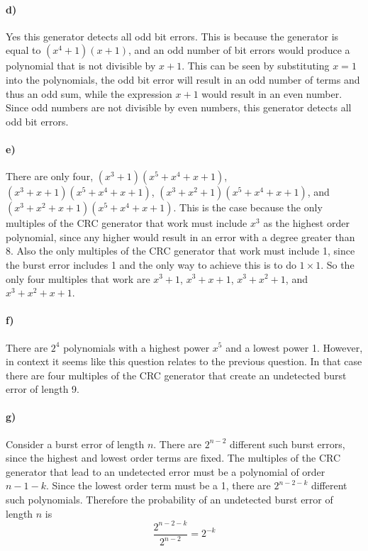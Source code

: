 \documentclass[12pt]{article}
\begin{document}
\paragraph{d)}

Yes this generator detects all odd bit errors. This is because the generator is equal to \((x^4+1)(x+1)\), and an odd number of bit errors would produce a polynomial that is not divisible by \(x+1\). This can be
seen by substituting \(x=1\) into the polynomials, the odd bit error will result in an odd number of terms and thus an odd sum, while the expression \(x+1\) would result in an even number. Since odd numbers are
not divisible by even numbers, this generator detects all odd bit errors.

\paragraph{e)}

There are only four, \((x^3+1)(x^5+x^4+x+1)\), \((x^3+x+1)(x^5+x^4+x+1)\), \((x^3+x^2+1)(x^5+x^4+x+1)\), and \((x^3+x^2+x+1)(x^5+x^4+x+1)\). This is the case because the only multiples of the CRC generator
that work must include \(x^3\) as the highest order polynomial, since any higher would result in an error with a degree greater than 8. Also the only multiples of the CRC generator that work must include 1,
since the burst error includes 1 and the only way to achieve this is to do \(1\times 1\). So the only four multiples that work are \(x^3+1\), \(x^3+x+1\), \(x^3+x^2+1\), and \(x^3+x^2+x+1\).

\paragraph{f)}

There are \(2^4\) polynomials with a highest power \(x^5\) and a lowest power 1. However, in context it seems like this question relates to the previous question. In that case there are four multiples of the
CRC generator that create an undetected burst error of length 9.

\paragraph{g)}

Consider a burst error of length \(n\). There are \(2^{n-2}\) different such burst errors, since the highest and lowest order terms are fixed. The multiples of the CRC generator that lead to an undetected error must be
a polynomial of order \(n-1-k\). Since the lowest order term must be a 1, there are \(2^{n-2-k}\) different such polynomials. Therefore the probability of an undetected burst error of length \(n\) is
\[\frac{2^{n-2-k}}{2^{n-2}}=2^{-k}\]
\end{document}
